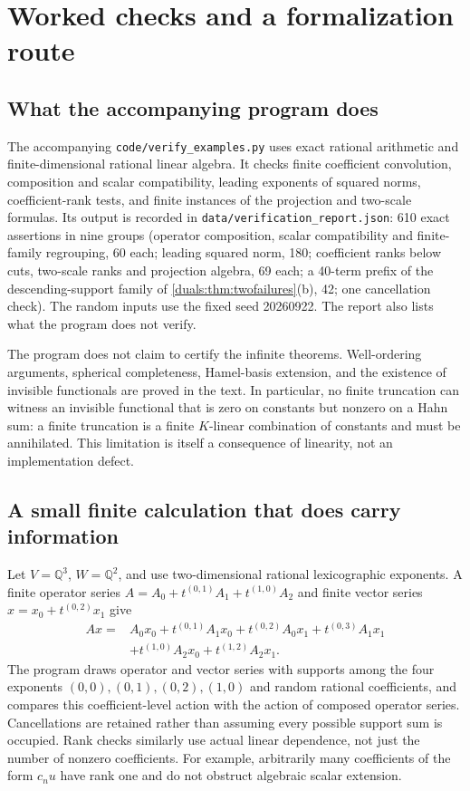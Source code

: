 \documentclass[11pt,letterpaper]{article}
\numberwithin{equation}{section}
\theoremstyle{definition}
\theoremstyle{remark}
\newcommand{\Q}{\mathbb Q}
\begin{document}
\section{Worked checks and a formalization route}\label{duals:sec:checks}

\subsection{What the accompanying program does}
The accompanying \texttt{code/verify\_examples.py} uses exact rational
arithmetic and finite-dimensional rational linear algebra. It checks
finite coefficient convolution, composition and scalar compatibility,
leading exponents of squared norms, coefficient-rank tests, and finite
instances of the projection and two-scale formulas. Its output is
recorded in \texttt{data/verification\_report.json}: 610 exact
assertions in nine groups (operator composition, scalar compatibility and
finite-family regrouping, 60 each; leading squared norm, 180; coefficient
ranks below cuts, two-scale ranks and projection algebra, 69 each;
a 40-term prefix of the descending-support family of
\cref{duals:thm:twofailures}(b), 42; one cancellation check). The random
inputs use the fixed seed 20260922. The report also lists what the
program does not verify.

The program does not claim to certify the infinite theorems.
Well-ordering arguments, spherical completeness, Hamel-basis extension,
and the existence of invisible functionals are proved in the text.
In particular, no finite truncation can witness an invisible functional
that is zero on constants but nonzero on a Hahn sum: a finite
truncation is a finite $K$-linear combination of constants and must be
annihilated. This limitation is itself a consequence of linearity,
not an implementation defect.

\subsection{A small finite calculation that does carry information}
Let $V=\Q^3$, $W=\Q^2$, and use two-dimensional rational lexicographic
exponents. A finite operator series
$A=A_0+t^{(0,1)}A_1+t^{(1,0)}A_2$ and finite vector series
$x=x_0+t^{(0,2)}x_1$ give
\begin{align*}
 Ax={}&A_0x_0+t^{(0,1)}A_1x_0+t^{(0,2)}A_0x_1
       +t^{(0,3)}A_1x_1\\
     &+t^{(1,0)}A_2x_0+t^{(1,2)}A_2x_1.
\end{align*}
The program draws operator and vector series with supports among the
four exponents $(0,0),(0,1),(0,2),(1,0)$ and random rational
coefficients, and compares this coefficient-level action with the action
of composed operator series. Cancellations are retained rather than
assuming every possible support sum is occupied. Rank checks similarly
use actual linear dependence, not just the number of nonzero
coefficients. For example, arbitrarily many coefficients of the form
$c_nu$ have rank one and do not obstruct algebraic scalar extension.
\end{document}
